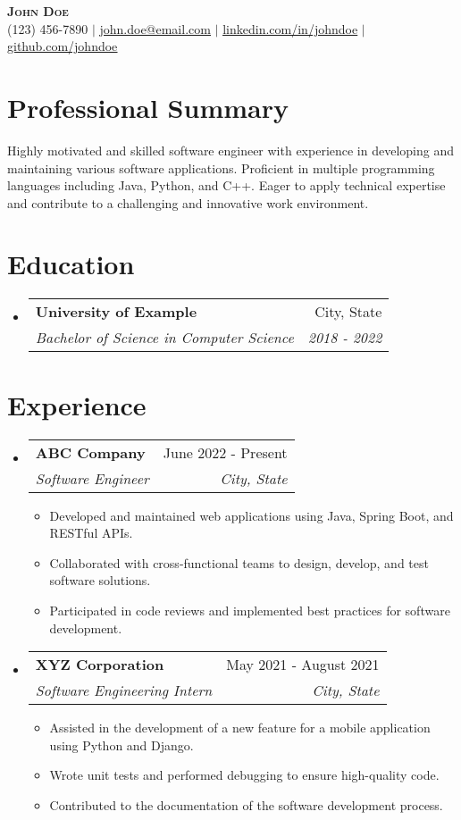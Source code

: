 \documentclass[letterpaper,11pt]{article}
\makeatletter
\newcommand{\resumeItem}[1]{
\item\small{
{#1 \vspace{-2pt}}
}
}
\newcommand{\resumeSubheading}[4]{
\vspace{-2pt}\item
\begin{tabular*}{0.97\textwidth}[t]{l@{\extracolsep{\fill}}r}
\textbf{#1} & #2 \\
\textit{\small#3} & \textit{\small #4} \\
\end{tabular*}\vspace{-7pt}
}
\newcommand{\resumeSubHeadingListStart}{\begin{itemize}[leftmargin=0.15in, label={}]}
\newcommand{\resumeSubHeadingListEnd}{\end{itemize}}
\newcommand{\resumeItemListStart}{\begin{itemize}}
\newcommand{\resumeItemListEnd}{\end{itemize}\vspace{-5pt}}
\makeatother
\begin{document}
\begin{center}
\textbf{\Huge \scshape John Doe} \\ \vspace{1pt}
\small (123) 456-7890 $|$ \href{mailto:john.doe@email.com}{\underline{john.doe@email.com}} $|$
\href{https://www.linkedin.com/in/johndoe}{\underline{linkedin.com/in/johndoe}} $|$
\href{https://github.com/johndoe}{\underline{github.com/johndoe}}
\end{center}


\section{Professional Summary} %
Highly motivated and skilled software engineer with experience in developing and maintaining various software applications. Proficient in multiple programming languages including Java, Python, and C++. Eager to apply technical expertise and contribute to a challenging and innovative work environment.

\section{Education}
\resumeSubHeadingListStart
\resumeSubheading{University of Example}{City, State}{Bachelor of Science in Computer Science}{2018 - 2022}
\resumeSubHeadingListEnd

\section{Experience}
\resumeSubHeadingListStart
\resumeSubheading{ABC Company}{June 2022 - Present}{Software Engineer}{City, State}
\resumeItemListStart
\resumeItem{Developed and maintained web applications using Java, Spring Boot, and RESTful APIs.}
\resumeItem{Collaborated with cross-functional teams to design, develop, and test software solutions.}
\resumeItem{Participated in code reviews and implemented best practices for software development.}
\resumeItemListEnd

\resumeSubheading{XYZ Corporation}{May 2021 - August 2021}{Software Engineering Intern}{City, State}
\resumeItemListStart
\resumeItem{Assisted in the development of a new feature for a mobile application using Python and Django.}
\resumeItem{Wrote unit tests and performed debugging to ensure high-quality code.}
\resumeItem{Contributed to the documentation of the software development process.}
\resumeItemListEnd
\resumeSubHeadingListEnd
\end{document}
